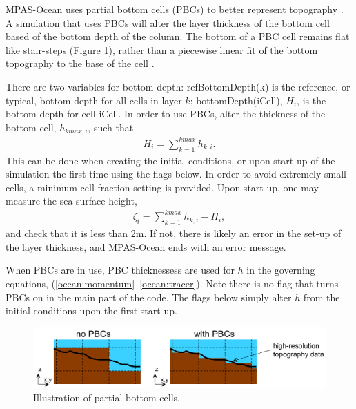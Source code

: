 MPAS-Ocean uses partial bottom cells (PBCs) to better represent topography \citep{Pacanowski_Gnanadesikan98mwr}.  A simulation that uses PBCs will alter the layer thickness of the bottom cell based of the bottom depth of the column.  The bottom of a PBC cell remains flat like stair-steps (Figure \ref{oceanFigure:pbcs}), rather than a piecewise linear fit of the bottom topography to the base of the cell \citep{Adcroft_ea97mwr}. 

There are two variables for bottom depth: refBottomDepth(k) is the reference, or typical, bottom depth for all cells in layer $k$; bottomDepth(iCell), $H_i$, is the bottom depth for cell iCell.  In order to use PBCs, alter the thickness of the bottom cell, $h_{kmax,i}$, such that
\begin{eqnarray}
\label{ocean:pbc thickness}
H_i =  \sum_{k=1}^{kmax}h_{k,i}.
\end{eqnarray}
This can be done when creating the initial conditions, or upon start-up of the simulation the first time using the flags below.  In order to avoid extremely small cells, a minimum cell fraction setting is provided.  Upon start-up, one may measure the sea surface height,
\begin{eqnarray}
\label{ocean:pbc SSH}
\zeta_i = \sum_{k=1}^{kmax}h_{k,i} - H_i,
\end{eqnarray}
and check that it is less than 2m.  If not, there is likely an error in the set-up of the layer thickness, and MPAS-Ocean ends with an error message.

When PBCs are in use, PBC thicknessess are used for $h$ in the governing equations, (\ref{ocean:momentum}--\ref{ocean:tracer}).  Note there is no flag that turns PBCs on in the main part of the code.  The flags below simply alter $h$ from the initial conditions upon the first start-up.

\begin{figure}[h!b]
\centering
\includegraphics[scale=0.4]{ocean/figures/partial_bottom_cells.png}
\caption{Illustration of partial bottom cells.}
\label{oceanFigure:pbcs}
\end{figure}

